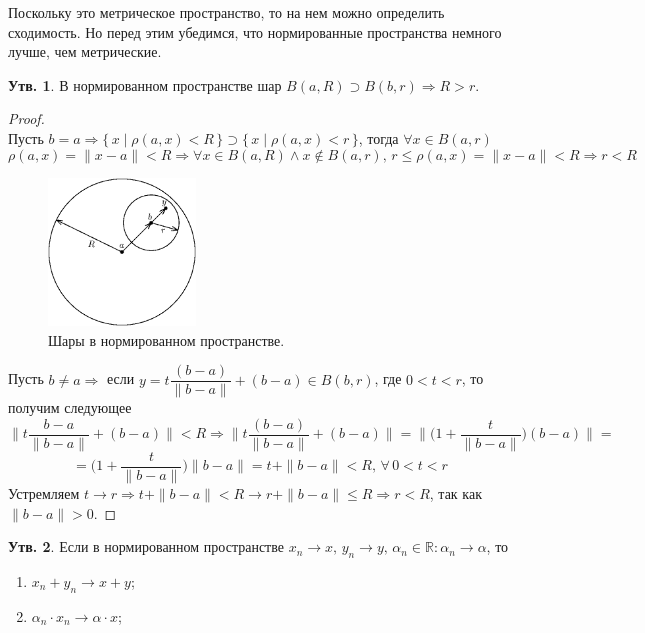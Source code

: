 \documentclass[12pt]{article}
\newcommand{\MR}{\mathbb{R}}
\theoremstyle{definition}
\newtheorem{prop}{Утв.}
\begin{document}
Поскольку это метрическое пространство, то на нем можно определить сходимость. Но перед этим убедимся, что нормированные пространства немного лучше, чем метрические.
\begin{prop}
	В нормированном пространстве шар $B(a,R) \supset B(b,r) \Rightarrow R > r$.
\end{prop}
\begin{proof}\hfill\\
	Пусть $b = a \Rightarrow \{\, x \mid \rho(a,x) < R \, \} \supset \{\, x \mid \rho(a,x) < r \, \}$, тогда $	\forall x \in B(a,r)$
	$$
	 \rho(a,x) = \|x-a\| < R \Rightarrow \forall x \in B(a,R) \wedge x \notin B(a,r), \, r \leq \rho(a,x) = \|x-a\| < R  \Rightarrow r < R
	$$
	
	\begin{figure}[H]
		\centering
		\includegraphics[width=0.35\textwidth]{4_1.eps}
		\caption{Шары в нормированном пространстве.}
		\label{4_1}
	\end{figure}
	
	Пусть $b \neq a \Rightarrow$ если $y = t\dfrac{(b-a)}{\|b-a\|} + (b-a) \in B(b,r)$, где $0 < t < r$, то получим следующее
	$$
		\bigg\| t\dfrac{b-a}{\|b-a\|} + (b-a)\bigg\| < R \Rightarrow
		\bigg\| t\dfrac{(b-a)}{\|b-a\|} + (b-a)\bigg\| = \bigg\| \bigg(1 + \dfrac{t}{\|b-a\|}\bigg)(b-a)\bigg\| =
	$$
	$$	
		=  \bigg(1 + \dfrac{t}{\|b-a\|}\bigg)\|b-a\| = t + \|b-a\| < R, \, \forall\, 0< t < r
	$$
	Устремляем $t \to r \Rightarrow t + \|b-a\| < R \to r + \|b-a\| \leq R \Rightarrow r < R$, так как $\|b-a\| >0$.
\end{proof}
\newpage
\begin{prop}
	Если в нормированном пространстве $x_n \to x, \, y_n \to y, \, \alpha_n \in \MR \colon \alpha_n \to \alpha$, то 
	\begin{enumerate}[label={(\arabic*)}]
		\item $x_n + y_n \to x + y$;
		\item $\alpha_n \cdot x_n \to \alpha \cdot x$;
	\end{enumerate}
\end{prop}
\end{document}
